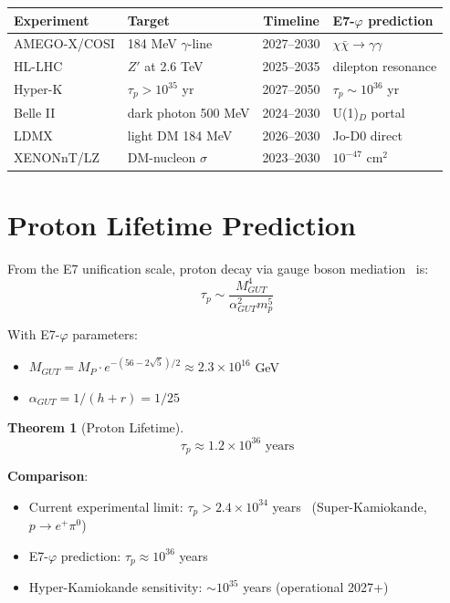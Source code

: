 \documentclass[11pt,a4paper]{article}
\newtheorem{theorem}{Theorem}
\begin{document}
\begin{center}
\begin{tabular}{|l|l|c|l|}
\hline
\textbf{Experiment} & \textbf{Target} & \textbf{Timeline} & \textbf{E7-$\varphi$ prediction} \\
\hline
AMEGO-X/COSI & 184 MeV $\gamma$-line & 2027--2030 & $\chi\bar{\chi} \to \gamma\gamma$ \\
HL-LHC & $Z'$ at 2.6 TeV & 2025--2035 & dilepton resonance \\
Hyper-K & $\tau_p > 10^{35}$ yr & 2027--2050 & $\tau_p \sim 10^{36}$ yr \\
Belle II & dark photon 500 MeV & 2024--2030 & U(1)$_D$ portal \\
LDMX & light DM 184 MeV & 2026--2030 & Jo-D0 direct \\
XENONnT/LZ & DM-nucleon $\sigma$ & 2023--2030 & $10^{-47}$ cm$^2$ \\
\hline
\end{tabular}
\end{center}

\section{Proton Lifetime Prediction}

From the E7 unification scale, proton decay via gauge boson mediation~\cite{Langacker1981,SuperK2020} is:
\begin{equation}
\tau_p \sim \frac{M_{GUT}^4}{\alpha_{GUT}^2 m_p^5}
\end{equation}

With E7-$\varphi$ parameters:
\begin{itemize}
\item $M_{GUT} = M_P \cdot e^{-(56-2\sqrt{5})/2} \approx 2.3 \times 10^{16}$ GeV
\item $\alpha_{GUT} = 1/(h + r) = 1/25$
\end{itemize}

\begin{theorem}[Proton Lifetime]
\begin{equation}
\tau_p \approx 1.2 \times 10^{36} \text{ years}
\end{equation}
\end{theorem}

\textbf{Comparison}:
\begin{itemize}
\item Current experimental limit: $\tau_p > 2.4 \times 10^{34}$ years~\cite{SuperK2020} (Super-Kamiokande, $p \to e^+ \pi^0$)
\item E7-$\varphi$ prediction: $\tau_p \approx 10^{36}$ years
\item Hyper-Kamiokande sensitivity: $\sim 10^{35}$ years (operational 2027+)
\end{itemize}
\end{document}
